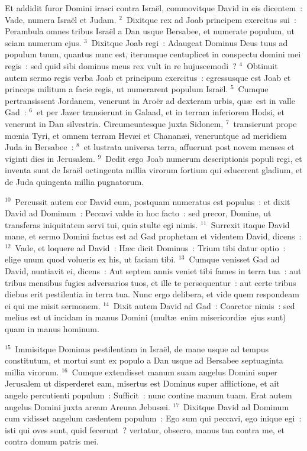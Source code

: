 \lettrine[lines=3,image=true,loversize=0.05,lraise=-0.03]{E}{}t addidit furor Domini irasci contra Isra\"el, commovitque David in eis dicentem~: Vade, numera Isra\"el et Judam.
${}^{2}$~Dixitque rex ad Joab principem exercitus sui~: Perambula omnes tribus Isra\"el a Dan usque Bersabee, et numerate populum, ut sciam numerum ejus.
${}^{3}$~Dixitque Joab regi~: Adaugeat Dominus Deus tuus ad populum tuum, quantus nunc est, iterumque centuplicet in conspectu domini mei regis~: sed quid sibi dominus meus rex vult in re hujuscemodi~?
${}^{4}$~Obtinuit autem sermo regis verba Joab et principum exercitus~: egressusque est Joab et princeps militum a facie regis, ut numerarent populum Isra\"el.
${}^{5}$~Cumque pertransissent Jordanem, venerunt in Aro\"er ad dexteram urbis, qu\ae\ est in valle Gad~:
${}^{6}$~et per Jazer transierunt in Galaad, et in terram inferiorem Hodsi, et venerunt in Dan silvestria. Circumeuntesque juxta Sidonem,
${}^{7}$~transierunt prope mœnia Tyri, et omnem terram Hev\ae i et Chanan\ae i, veneruntque ad meridiem Juda in Bersabee~:
${}^{8}$~et lustrata universa terra, affuerunt post novem menses et viginti dies in Jerusalem.
${}^{9}$~Dedit ergo Joab numerum descriptionis populi regi, et inventa sunt de Isra\"el octingenta millia virorum fortium qui educerent gladium, et de Juda quingenta millia pugnatorum.


${}^{10}$~Percussit autem cor David eum, postquam numeratus est populus~: et dixit David ad Dominum~: Peccavi valde in hoc facto~: sed precor, Domine, ut transferas iniquitatem servi tui, quia stulte egi nimis.
${}^{11}$~Surrexit itaque David mane, et sermo Domini factus est ad Gad prophetam et videntem David, dicens~:
${}^{12}$~Vade, et loquere ad David~: H\ae c dicit Dominus~: Trium tibi datur optio~: elige unum quod volueris ex his, ut faciam tibi.
${}^{13}$~Cumque venisset Gad ad David, nuntiavit ei, dicens~: Aut septem annis veniet tibi fames in terra tua~: aut tribus mensibus fugies adversarios tuos, et ille te persequentur~: aut certe tribus diebus erit pestilentia in terra tua. Nunc ergo delibera, et vide quem respondeam ei qui me misit sermonem.
${}^{14}$~Dixit autem David ad Gad~: Coarctor nimis~: sed melius est ut incidam in manus Domini (mult\ae\ enim misericordi\ae\ ejus sunt) quam in manus hominum.


${}^{15}$~Immisitque Dominus pestilentiam in Isra\"el, de mane usque ad tempus constitutum, et mortui sunt ex populo a Dan usque ad Bersabee septuaginta millia virorum.
${}^{16}$~Cumque extendisset manum suam angelus Domini super Jerusalem ut disperderet eam, misertus est Dominus super afflictione, et ait angelo percutienti populum~: Sufficit~: nunc contine manum tuam. Erat autem angelus Domini juxta aream Areuna Jebus\ae i.
${}^{17}$~Dixitque David ad Dominum cum vidisset angelum c\ae dentem populum~: Ego sum qui peccavi, ego inique egi~: isti qui oves sunt, quid fecerunt~? vertatur, obsecro, manus tua contra me, et contra domum patris mei.


